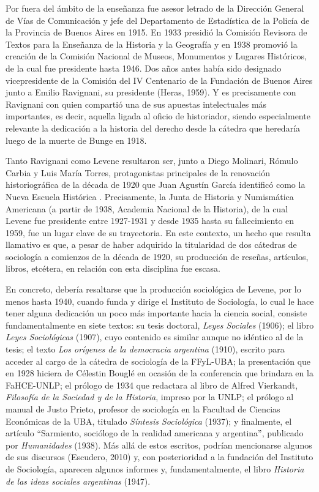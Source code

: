 Por fuera del ámbito de la enseñanza fue asesor letrado de la Dirección General de Vías de Comunicación y jefe del Departamento de Estadística de la Policía de la Provincia de Buenos Aires en 1915. En 1933 presidió la Comisión Revisora de Textos para la Enseñanza de la Historia y la Geografía y en 1938 promovió la creación de la Comisión Nacional de Museos, Monumentos y Lugares Históricos, de la cual fue presidente hasta 1946. Dos años antes había sido designado vicepresidente de la Comisión del IV Centenario de la Fundación de Buenos Aires junto a Emilio Ravignani, su presidente (Heras, 1959). Y es precisamente con Ravignani con quien compartió una de sus apuestas intelectuales más importantes, es decir, aquella ligada al oficio de historiador, siendo especialmente relevante la dedicación a la historia del derecho desde la cátedra que heredaría luego de la muerte de Bunge en 1918.

Tanto Ravignani como Levene resultaron ser, junto a Diego Molinari, Rómulo Carbia y Luis María Torres, protagonistas principales de la renovación historiográfica de la década de 1920 que Juan Agustín García identificó como la Nueva Escuela Histórica \parencite{282-ZARRILLI1998}. Precisamente, la Junta de Historia y Numismática Americana (a partir de 1938, Academia Nacional de la Historia), de la cual Levene fue presidente entre 1927-1931 y desde 1935 hasta su fallecimiento en 1959, fue un lugar clave de su trayectoria. En este contexto, un hecho que resulta llamativo es que, a pesar de haber adquirido la titularidad de dos cátedras de sociología a comienzos de la década de 1920, su producción de reseñas, artículos, libros, etcétera, en relación con esta disciplina fue escasa.

En concreto, debería resaltarse que la producción sociológica de Levene, por lo menos hasta 1940, cuando funda y dirige el Instituto de Sociología, lo cual le hace tener alguna dedicación un poco más importante hacia la ciencia social, consiste fundamentalmente en siete textos: su tesis doctoral, \emph{Leyes Sociales} (1906); el libro \emph{Leyes Sociológicas} (1907), cuyo contenido es similar aunque no idéntico al de la tesis; el texto \emph{Los orígenes de la democracia argentina} (1910), escrito para acceder al cargo de la cátedra de sociología de la FFyL-UBA; la presentación que en 1928 hiciera de Célestin Bouglé en ocasión de la conferencia que brindara en la FaHCE-UNLP; el prólogo de 1934 que redactara al libro de Alfred Vierkandt, \emph{Filosofía de la Sociedad y de la Historia}, impreso por la UNLP; el prólogo al manual de Justo Prieto, profesor de sociología en la Facultad de Ciencias Económicas de la UBA, titulado \emph{Síntesis Sociológica} (1937); y finalmente, el artículo \enquote{Sarmiento, sociólogo de la realidad americana y argentina}, publicado por \emph{Humanidades} (1938). Más allá de estos escritos, podrían mencionarse algunos de sus discursos (Escudero, 2010) y, con posterioridad a la fundación del Instituto de Sociología, aparecen algunos informes y, fundamentalmente, el libro \emph{Historia de las ideas sociales argentinas} (1947).

